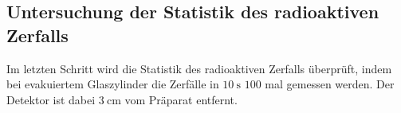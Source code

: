 \subsection{Untersuchung der Statistik des radioaktiven Zerfalls}
Im letzten Schritt wird die Statistik des radioaktiven Zerfalls überprüft, indem bei evakuiertem Glaszylinder die Zerfälle in $\SI{10}{\second}$ $\num{100}$ mal gemessen werden. Der Detektor ist dabei $\SI{3}{\centi\meter}$ vom Präparat entfernt.